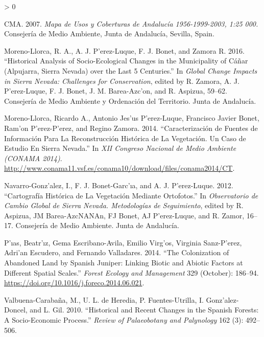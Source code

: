\documentclass[
]{article}
\newlength{\cslhangindent}
\newenvironment{CSLReferences}[2] %
 {%
  \setlength{\parindent}{0pt}
  \ifodd #1 \everypar{\setlength{\hangindent}{\cslhangindent}}\ignorespaces\fi
  \ifnum #2 > 0
  \setlength{\parskip}{#2\baselineskip}
  \fi
 }%
 {}
\begin{document}
\hypertarget{refs}{}
\begin{CSLReferences}{1}{0}
\leavevmode\hypertarget{ref-CMA2007MapaUsos}{}%
CMA. 2007. \emph{Mapa de Usos y Coberturas de {Andalucía}
1956-1999-2003, 1:25 000.} {Consejería de Medio Ambiente, Junta de
Andalucía, Sevilla, Spain}.

\leavevmode\hypertarget{ref-MorenoLlorcaetal2016HistoricalAnalysis}{}%
Moreno-Llorca, R. A., A. J. P'erez-Luque, F. J. Bonet, and Zamora R.
2016. {``Historical Analysis of Socio-Ecological Changes in the
Municipality of {Cáñar} ({Alpujarra}, {Sierra Nevada}) over the Last 5
Centuries.''} In \emph{Global Change Impacts in {Sierra Nevada}:
Challenges for Conservation}, edited by R. Zamora, A. J. P'erez-Luque,
F. J. Bonet, J. M. Barea-Azc'on, and R. Aspizua, 59--62. {Consejería de
Medio Ambiente y Ordenación del Territorio. Junta de Andalucía}.

\leavevmode\hypertarget{ref-MorenoLlorcaetal2014CaracterizacionFuentes}{}%
Moreno-Llorca, Ricardo A., Antonio Jes'us P'erez-Luque, Francisco Javier
Bonet, Ram'on P'erez-P'erez, and Regino Zamora. 2014. {``Caracterización
de Fuentes de Información Para La Reconstrucción Histórica de La
Vegetación. {Un} Caso de Estudio En {Sierra Nevada}.''} In \emph{{XII
Congreso Nacional} de {Medio Ambiente} ({CONAMA} 2014)}.
\url{http://www.conama11.vsf.es/conama10/download/files/conama2014/CT}.

\leavevmode\hypertarget{ref-NavarroGonzalezetal2012CartografiaHistorica}{}%
Navarro-Gonz'alez, I., F. J. Bonet-Garc'ıa, and A. J. P'erez-Luque.
2012. {``Cartografía Histórica de La Vegetación Mediante Ortofotos.''}
In \emph{Observatorio de {Cambio Global} de {Sierra Nevada}.
{Metodologías} de Seguimiento}, edited by R. Aspizua, JM Barea-AzcNANAn,
FJ Bonet, AJ P'erez-Luque, and R. Zamor, 16--17. {Consejería de Medio
Ambiente. Junta de Andalucía}.

\leavevmode\hypertarget{ref-Piasetal2014ColonizationAbandoned}{}%
P'ıas, Beatr'ız, Gema Escribano-Avila, Emilio Virg'os, Virginia
Sanz-P'erez, Adri'an Escudero, and Fernando Valladares. 2014. {``The
Colonization of Abandoned Land by {Spanish} Juniper: {Linking} Biotic
and Abiotic Factors at Different Spatial Scales.''} \emph{Forest Ecology
and Management} 329 (October): 186--94.
\url{https://doi.org/10.1016/j.foreco.2014.06.021}.

\leavevmode\hypertarget{ref-ValbuenaCarabanaetal2010HistoricalRecent}{}%
Valbuena-Carabaña, M., U. L. de Heredia, P. Fuentes-Utrilla, I.
Gonz'alez-Doncel, and L. Gil. 2010. {``Historical and Recent Changes in
the {Spanish} Forests: A Socio-Economic Process.''} \emph{Review of
Palaeobotany and Palynology} 162 (3): 492--506.

\end{CSLReferences}
\end{document}

